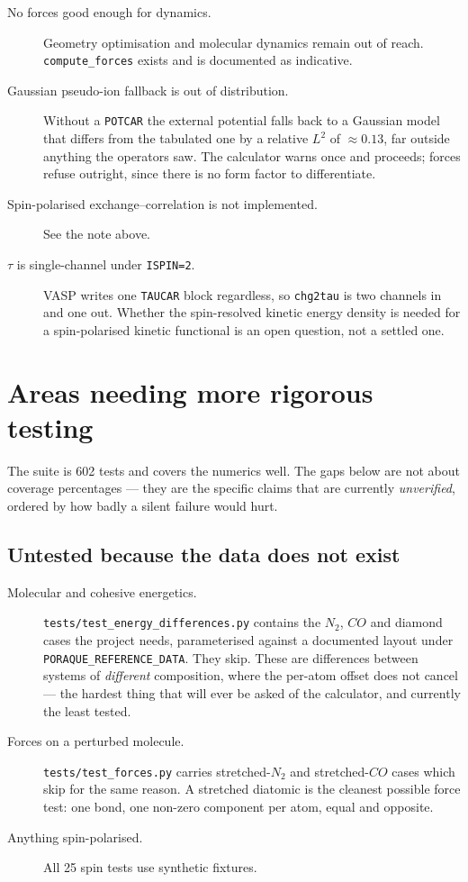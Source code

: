 \documentclass[11pt,a4paper]{report}
\newcommand{\file}[1]{\texttt{#1}}
\newcommand{\opt}[1]{\texttt{#1}}
\newcommand{\pyclass}[1]{\texttt{#1}}
\begin{document}
\begin{description}
\item[No forces good enough for dynamics.] Geometry optimisation and molecular
  dynamics remain out of reach. \pyclass{compute\_forces} exists and is
  documented as indicative.
\item[Gaussian pseudo-ion fallback is out of distribution.] Without a
  \file{POTCAR} the external potential falls back to a Gaussian model that
  differs from the tabulated one by a relative $L^2$ of $\approx0.13$, far
  outside anything the operators saw. The calculator warns once and proceeds;
  forces refuse outright, since there is no form factor to differentiate.
\item[Spin-polarised exchange--correlation is not implemented.] See the note
  above.
\item[$\tau$ is single-channel under \opt{ISPIN=2}.] VASP writes one
  \file{TAUCAR} block regardless, so \opt{chg2tau} is two channels in and one
  out. Whether the spin-resolved kinetic energy density is needed for a
  spin-polarised kinetic functional is an open question, not a settled one.
\end{description}

\chapter{Areas needing more rigorous testing}

The suite is 602 tests and covers the numerics well. The gaps below are not
about coverage percentages --- they are the specific claims that are currently
\emph{unverified}, ordered by how badly a silent failure would hurt.

\section{Untested because the data does not exist}

\begin{description}
\item[Molecular and cohesive energetics.]
  \file{tests/test\_energy\_differences.py} contains the $N_2$, $CO$ and
  diamond cases the project needs, parameterised against a documented layout
  under \opt{PORAQUE\_REFERENCE\_DATA}. They skip. These are differences
  between systems of \emph{different} composition, where the per-atom offset
  does not cancel --- the hardest thing that will ever be asked of the
  calculator, and currently the least tested.
\item[Forces on a perturbed molecule.] \file{tests/test\_forces.py} carries
  stretched-$N_2$ and stretched-$CO$ cases which skip for the same reason. A
  stretched diatomic is the cleanest possible force test: one bond, one
  non-zero component per atom, equal and opposite.
\item[Anything spin-polarised.] All 25 spin tests use synthetic fixtures.
\end{description}
\end{document}
